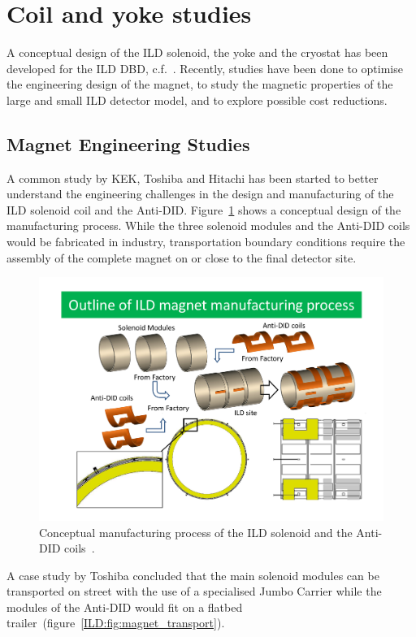 \section{Coil and yoke studies}

A conceptual design of the ILD solenoid, the yoke and the cryostat has been developed for the ILD DBD, c.f.~\cite{ild:bib:Magnet_Note, ild:bib:Cryostat_Note}. Recently, studies have been done to optimise the engineering design of the magnet, to study the magnetic properties of the large and small ILD detector model, and to explore possible cost reductions.

\subsection{Magnet Engineering Studies}
A common study by KEK, Toshiba and Hitachi has been started to better understand the engineering challenges in the design and manufacturing of the ILD solenoid coil and the Anti-DID. Figure~\ref{ILD:fig:solenoid_manufacturing} shows a conceptual design of the manufacturing process. While the three solenoid modules and the Anti-DID coils would be fabricated in industry, transportation boundary conditions require the assembly of the complete magnet on or close to the final detector site.
\begin{figure}[h!]
    \centering
    \includegraphics[width=0.8\hsize]{Integration/fig/Solenoid_Manufacturing.pdf}
    \caption{Conceptual manufacturing process of the ILD solenoid and the Anti-DID coils~\cite{ild:bib:Solenoid_Manufacturing}.}
    \label{ILD:fig:solenoid_manufacturing}
\end{figure}
A case study by Toshiba concluded that the main solenoid modules can be transported on street with the use of a specialised Jumbo Carrier while the modules of the Anti-DID would fit on a flatbed trailer~(figure~\ref{ILD:fig:magnet_transport}).
